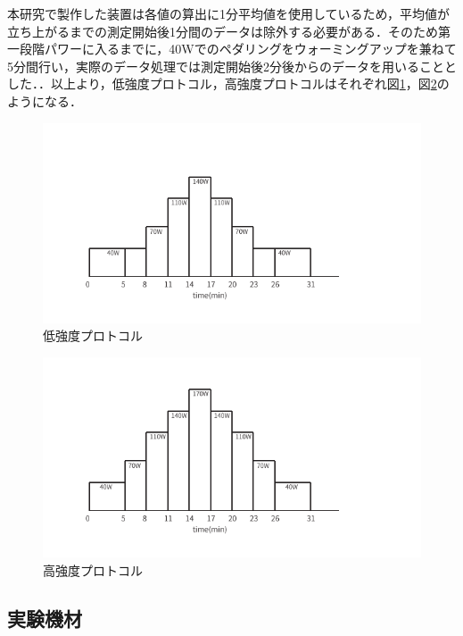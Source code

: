 本研究で製作した装置は各値の算出に1分平均値を使用しているため，平均値が立ち上がるまでの測定開始後1分間のデータは除外する必要がある．そのため第一段階パワーに入るまでに，40Wでのペダリングをウォーミングアップを兼ねて5分間行い，実際のデータ処理では測定開始後2分後からのデータを用いることとした．．以上より，低強度プロトコル，高強度プロトコルはそれぞれ図\ref{fig:protocol_rampup_light}，図\ref{fig:protocol_rampup_hard}のようになる．

\begin{figure}[h]
  \begin{center}
    \label{fig:protocol_rampup_light}
    \caption{低強度プロトコル}
    \includegraphics[width=12cm]{fig/protocol_rampup_light.pdf}
  \end{center}
\end{figure}

\begin{figure}[h]
  \begin{center}
    \label{fig:protocol_rampup_hard}
    \caption{高強度プロトコル}
    \includegraphics[width=12cm]{fig/protocol_rampup_hard.pdf}
  \end{center}
\end{figure}

\subsection{実験機材}

